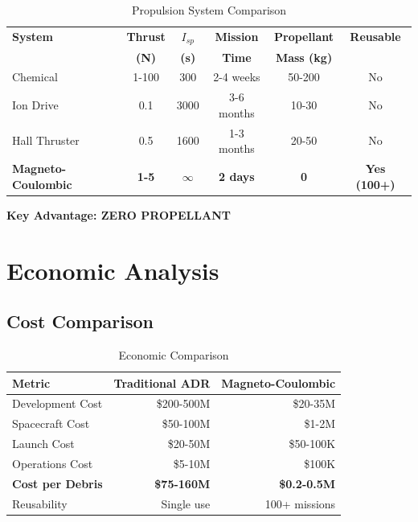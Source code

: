 \documentclass[11pt,a4paper]{article}
\begin{document}
\begin{table}[h!]
\centering
\caption{Propulsion System Comparison}
\label{tab:propulsion}
\scriptsize
\begin{tabular}{lccccc}
\toprule
\textbf{System} & \textbf{Thrust} & \textbf{$I_{sp}$} & \textbf{Mission} & \textbf{Propellant} & \textbf{Reusable} \\
 & \textbf{(N)} & \textbf{(s)} & \textbf{Time} & \textbf{Mass (kg)} & \\
\midrule
Chemical & 1-100 & 300 & 2-4 weeks & 50-200 & No \\
Ion Drive & 0.1 & 3000 & 3-6 months & 10-30 & No \\
Hall Thruster & 0.5 & 1600 & 1-3 months & 20-50 & No \\
\rowcolor{yellow!20}\textbf{Magneto-Coulombic} & \textbf{1-5} & \textbf{$\infty$} & \textbf{2 days} & \textbf{0} & \textbf{Yes (100+)} \\
\bottomrule
\end{tabular}
\end{table}

\textbf{Key Advantage: ZERO PROPELLANT}

\section{Economic Analysis}

\subsection{Cost Comparison}

\begin{table}[h!]
\centering
\caption{Economic Comparison}
\label{tab:economics}
\begin{tabular}{lrr}
\toprule
\textbf{Metric} & \textbf{Traditional ADR} & \textbf{Magneto-Coulombic} \\
\midrule
Development Cost & \$200-500M & \$20-35M \\
Spacecraft Cost & \$50-100M & \$1-2M \\
Launch Cost & \$20-50M & \$50-100K \\
Operations Cost & \$5-10M & \$100K \\
\midrule
\textbf{Cost per Debris} & \textbf{\$75-160M} & \textbf{\$0.2-0.5M} \\
Reusability & Single use & 100+ missions \\
\bottomrule
\end{tabular}
\end{table}
\end{document}
